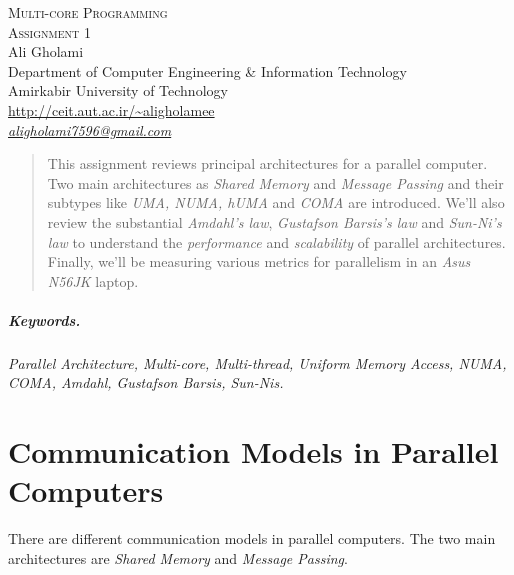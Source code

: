 \documentclass[12pt]{article}
\numberwithin{equation}{section}
\numberwithin{table}{section}
\numberwithin{figure}{section}
\begin{document}

\begin{center}
\textsc{\Large Multi-core Programming} \\[2pt]
	\textsc{\large Assignment 1}\\
	\vspace{0.5cm}
  Ali Gholami \\[6pt]
  Department of Computer Engineering \& Information Technology\\
  Amirkabir University of Technology  \\[6pt]
  \def\UrlFont{\em}
  \url{http://ceit.aut.ac.ir/~aligholamee}\\
    \href{mailto:aligholami7596@gmail.com}{\textit{aligholami7596@gmail.com}}
\end{center}

\begin{abstract}
This assignment reviews principal architectures for a parallel computer. Two main architectures as \textit{Shared Memory} and \textit{Message Passing} and their subtypes like \textit{UMA, NUMA, hUMA} and \textit{COMA} are introduced. We'll also review the substantial \textit{Amdahl's law}, \textit{Gustafson Barsis's law} and \textit{Sun-Ni’s law} to understand the \textit{performance} and \textit{scalability} of parallel architectures. Finally, we'll be measuring various metrics for parallelism in an \textit{Asus N56JK} laptop.
\end{abstract}

\subparagraph{Keywords.} \textit{Parallel Architecture, Multi-core, Multi-thread, Uniform Memory Access, NUMA, COMA, Amdahl, Gustafson Barsis, Sun-Nis.}

\section{Communication Models in Parallel Computers}
There are different communication models in parallel computers. The two main architectures are \textit{Shared Memory} and \textit{Message Passing}.
\end{document}
